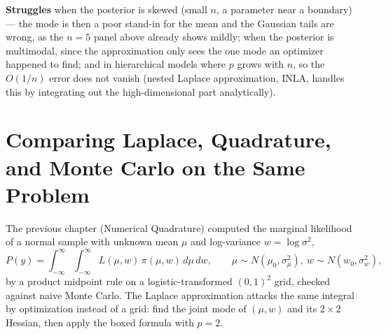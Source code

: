 \documentclass[
  letterpaper,
  DIV=11,
  numbers=noendperiod]{scrreprt}
\begin{document}
\textbf{Struggles} when the posterior is skewed (small \(n\), a
parameter near a boundary) --- the mode is then a poor stand-in for the
mean and the Gaussian tails are wrong, as the \(n=5\) panel above
already shows mildly; when the posterior is multimodal, since the
approximation only sees the one mode an optimizer happened to find; and
in hierarchical models where \(p\) grows with \(n\), so the \(O(1/n)\)
error does not vanish (nested Laplace approximation, INLA, handles this
by integrating out the high-dimensional part analytically).

\section{Comparing Laplace, Quadrature, and Monte Carlo on the Same
Problem}\label{comparing-laplace-quadrature-and-monte-carlo-on-the-same-problem}

The previous chapter (Numerical Quadrature) computed the marginal
likelihood of a normal sample with unknown mean \(\mu\) and log-variance
\(w=\log\sigma^2\), \[
P(y) = \int_{-\infty}^{\infty}\!\int_{-\infty}^{\infty} L(\mu,w)\,\pi(\mu,w)\,d\mu\,dw,
\qquad \mu\sim N(\mu_0,\sigma_\mu^2),\ w\sim N(w_0,\sigma_w^2),
\] by a product midpoint rule on a logistic-transformed \((0,1)^2\)
grid, checked against naive Monte Carlo. The Laplace approximation
attacks the same integral by optimization instead of a grid: find the
joint mode of \((\mu,w)\) and its \(2\times2\) Hessian, then apply the
boxed formula with \(p=2\).
\end{document}
